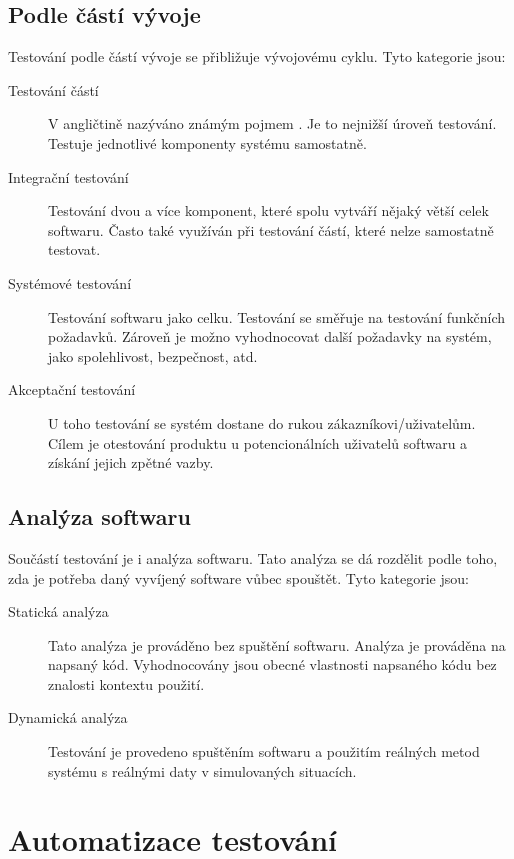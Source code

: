 \subsection{Podle částí vývoje}

Testování podle částí vývoje se přibližuje vývojovému cyklu. Tyto kategorie jsou:  

\begin{description}
    \item[Testování částí] V angličtině nazýváno známým pojmem . Je to nejnižší úroveň testování. Testuje jednotlivé komponenty systému samostatně.
    \item[Integrační testování] Testování dvou a více komponent, které spolu vytváří nějaký větší celek softwaru. Často také využíván při testování částí, které nelze samostatně testovat.
    \item[Systémové testování] Testování softwaru jako celku. Testování se směřuje na testování funkčních požadavků. Zároveň je možno vyhodnocovat další požadavky na systém, jako spolehlivost, bezpečnost, atd.
    \item[Akceptační testování] U toho testování se systém dostane do rukou zákazníkovi/uživatelům. Cílem je otestování produktu u potencionálních uživatelů softwaru a získání jejich zpětné vazby. 
\end{description}

\subsection{Analýza softwaru}
Součástí testování je i analýza softwaru. Tato analýza se dá rozdělit podle toho, zda je potřeba daný vyvíjený software vůbec spouštět. Tyto kategorie jsou:

\begin{description}
    \item[Statická analýza] Tato analýza je prováděno bez spuštění softwaru. Analýza je prováděna na napsaný kód. Vyhodnocovány jsou obecné vlastnosti napsaného kódu bez znalosti kontextu použití.
    \item[Dynamická analýza] Testování je provedeno spuštěním softwaru a použitím reálných metod systému s reálnými daty v simulovaných situacích. 
\end{description}

\section{Automatizace testování}


